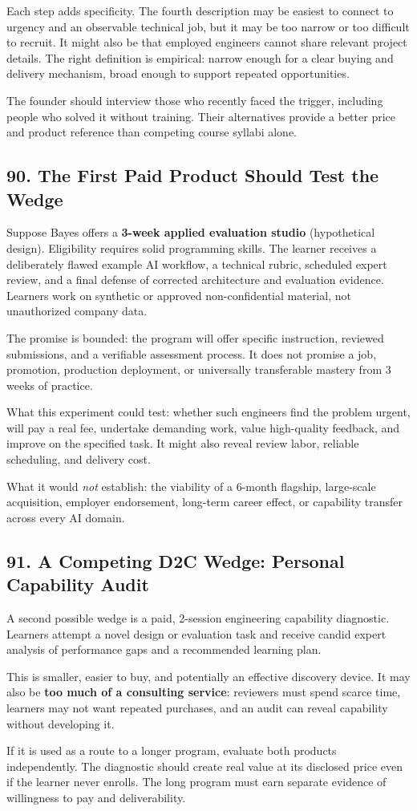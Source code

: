 Each step adds specificity. The fourth description may be easiest to connect to urgency and an observable technical job, but it may be too narrow or too difficult to recruit. It might also be that employed engineers cannot share relevant project details. The right definition is empirical: narrow enough for a clear buying and delivery mechanism, broad enough to support repeated opportunities.

The founder should interview those who recently faced the trigger, including people who solved it without training. Their alternatives provide a better price and product reference than competing course syllabi alone.

\subsection*{90. The First Paid Product Should Test the Wedge}

Suppose Bayes offers a \textbf{3-week applied evaluation studio} (hypothetical design). Eligibility requires solid programming skills. The learner receives a deliberately flawed example AI workflow, a technical rubric, scheduled expert review, and a final defense of corrected architecture and evaluation evidence. Learners work on synthetic or approved non-confidential material, not unauthorized company data.

The promise is bounded: the program will offer specific instruction, reviewed submissions, and a verifiable assessment process. It does not promise a job, promotion, production deployment, or universally transferable mastery from 3 weeks of practice.

What this experiment could test: whether such engineers find the problem urgent, will pay a real fee, undertake demanding work, value high-quality feedback, and improve on the specified task. It might also reveal review labor, reliable scheduling, and delivery cost.

What it would \emph{not} establish: the viability of a 6-month flagship, large-scale acquisition, employer endorsement, long-term career effect, or capability transfer across every AI domain.

\subsection*{91. A Competing D2C Wedge: Personal Capability Audit}

A second possible wedge is a paid, 2-session engineering capability diagnostic. Learners attempt a novel design or evaluation task and receive candid expert analysis of performance gaps and a recommended learning plan.

This is smaller, easier to buy, and potentially an effective discovery device. It may also be \textbf{too much of a consulting service}: reviewers must spend scarce time, learners may not want repeated purchases, and an audit can reveal capability without developing it.

If it is used as a route to a longer program, evaluate both products independently. The diagnostic should create real value at its disclosed price even if the learner never enrolls. The long program must earn separate evidence of willingness to pay and deliverability.
